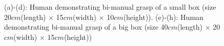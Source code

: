 \begin{figure}
  \hspace{1cm}
  \caption{ \scriptsize{(a)-(d): Human demonstrating bi-manual grasp of a small box (size 20$cm$(length) $\times$ 15$cm$(width) $\times$ 10$cm$(height)). (e)-(h): Human demonstrating bi-manual grasp of a big box (size 40$cm$(length) $\times$ 20$cm$(width) $\times$ 15$cm$(height))}
}
  \label{fig:graspdemo}
\end{figure}

